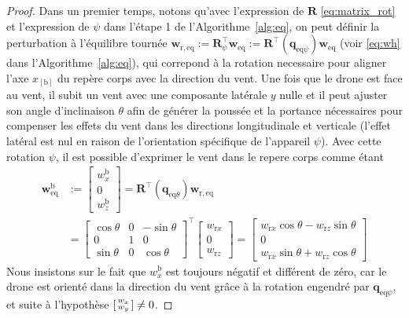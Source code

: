     \begin{proof}
        Dans un premier temps, notons qu'avec l'expression de $\boldsymbol{R}$ \eqref{eq:matrix_rot} et l'expression de  $\psi$ dans l'étape 1 de l'Algorithme~\ref{alg:eq}, on peut définir la perturbation à l'équilibre tournée $\boldsymbol{w}_{\mathrm{r,eq}} := \boldsymbol{R}^\top_{\psi} \boldsymbol{w}_{\mathrm{eq}} :=    \boldsymbol{R}^\top(\boldsymbol{q}_{\mathrm{eq}\psi})\boldsymbol{w}_{\mathrm{eq}}$ (voir \eqref{eq:wh} dans l'Algorithme~\ref{alg:eq}),
        qui correpond à la rotation necessaire pour aligner l'axe  $x_{[\text{b}]}$ du repère corps avec la direction du vent. Une fois que le drone est face au vent, il subit un vent avec une composante latérale $y$ nulle et il peut ajuster son angle d'inclinaison $\theta$ afin de générer la poussée et la portance nécessaires pour compenser les effets du vent dans les directions longitudinale et verticale (l'effet latéral est nul en raison de l'orientation spécifique de l'appareil $\psi$). Avec cette rotation $\psi$, il est possible d'exprimer le vent dans le repere corps comme étant
            \begin{align}
            \label{eq:wb}
                \boldsymbol{w}^{\text{b}}_{\mathrm{eq}} &:= 
                \begin{bmatrix}
                    w_{x}^{\text{b}} \\ 0 \\ w_{z}^{\text{b}}
                \end{bmatrix} \!=\! 
                \boldsymbol{R}^\top(\boldsymbol{q}_{\text{eq}\theta}) \boldsymbol{w}_{\mathrm{r,eq}}  \\
                &=\!\! \begin{bmatrix}
                    \cos{\theta} & 0 & -\sin{\theta}\\
                        0 & 1 & 0\\
                    \sin{\theta} & 0 & \cos{\theta}
                \end{bmatrix}^\top \!\! \begin{bmatrix}
                    w_{\text{r}x}\\
                    0\\
                    w_{\text{r}z}
                \end{bmatrix}
                \!\!=\!\!\begin{bmatrix}
                    w_{\text{r}x} \cos{\theta} - w_{\text{r}z} \sin{\theta}\\
                    0\\
                    w_{\text{r}x} \sin{\theta} +  w_{\text{r}z} \cos{\theta}
                \end{bmatrix}
            \nonumber
            \end{align}
        Nous insistons sur le fait que $w_{x}^{\text{b}}$ est toujours négatif et différent de zéro, car le drone est orienté dans la direction du vent grâce à la rotation engendré par $ \boldsymbol{q}_{\mathrm{eq}\psi}$, et suite à l'hypothèse $\left[ \begin{smallmatrix}w_x \\ w_y \end{smallmatrix} \right] \neq 0$.
    

\end{proof}
